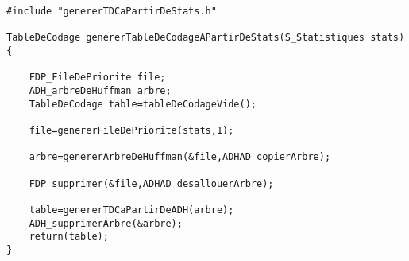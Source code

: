 \begin{verbatim}
#include "genererTDCaPartirDeStats.h"

TableDeCodage genererTableDeCodageAPartirDeStats(S_Statistiques stats){

	FDP_FileDePriorite file;
	ADH_arbreDeHuffman arbre;
	TableDeCodage table=tableDeCodageVide();

	file=genererFileDePriorite(stats,1);

	arbre=genererArbreDeHuffman(&file,ADHAD_copierArbre);
	
	FDP_supprimer(&file,ADHAD_desallouerArbre);
	
	table=genererTDCaPartirDeADH(arbre);
	ADH_supprimerArbre(&arbre);
	return(table);
}

\end{verbatim}
 

